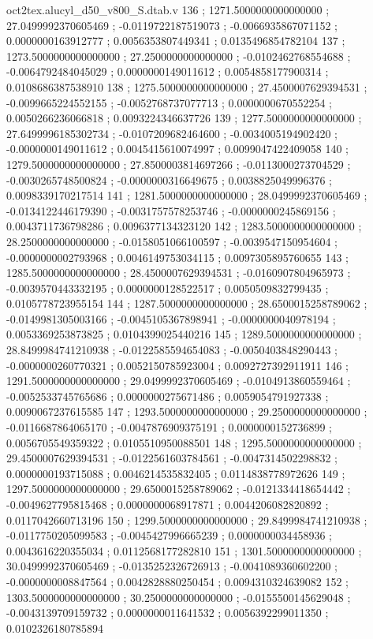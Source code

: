 \begin{filecontents}[overwrite]{oct2tex.alucyl_d50_v800_S.dtab.v}
136 ; 1271.5000000000000000 ; 27.0499992370605469 ; -0.0119722187519073 ; -0.0066935867071152 ; 0.0000000163912777 ; 0.0056353807449341 ; 0.0135496854782104
137 ; 1273.5000000000000000 ; 27.2500000000000000 ; -0.0102462768554688 ; -0.0064792484045029 ; 0.0000000149011612 ; 0.0054858177900314 ; 0.0108686387538910
138 ; 1275.5000000000000000 ; 27.4500007629394531 ; -0.0099665224552155 ; -0.0052768737077713 ; 0.0000000670552254 ; 0.0050266236066818 ; 0.0093224346637726
139 ; 1277.5000000000000000 ; 27.6499996185302734 ; -0.0107209682464600 ; -0.0034005194902420 ; -0.0000000149011612 ; 0.0045415610074997 ; 0.0099047422409058
140 ; 1279.5000000000000000 ; 27.8500003814697266 ; -0.0113000273704529 ; -0.0030265748500824 ; -0.0000000316649675 ; 0.0038825049996376 ; 0.0098339170217514
141 ; 1281.5000000000000000 ; 28.0499992370605469 ; -0.0134122446179390 ; -0.0031757578253746 ; -0.0000000245869156 ; 0.0043711736798286 ; 0.0096377134323120
142 ; 1283.5000000000000000 ; 28.2500000000000000 ; -0.0158051066100597 ; -0.0039547150954604 ; -0.0000000002793968 ; 0.0046149753034115 ; 0.0097305895760655
143 ; 1285.5000000000000000 ; 28.4500007629394531 ; -0.0160907804965973 ; -0.0039570443332195 ; 0.0000000128522517 ; 0.0050509832799435 ; 0.0105778723955154
144 ; 1287.5000000000000000 ; 28.6500015258789062 ; -0.0149981305003166 ; -0.0045105367898941 ; -0.0000000040978194 ; 0.0053369253873825 ; 0.0104399025440216
145 ; 1289.5000000000000000 ; 28.8499984741210938 ; -0.0122585594654083 ; -0.0050403848290443 ; -0.0000000260770321 ; 0.0052150785923004 ; 0.0092727392911911
146 ; 1291.5000000000000000 ; 29.0499992370605469 ; -0.0104913860559464 ; -0.0052533745765686 ; 0.0000000275671486 ; 0.0059054791927338 ; 0.0090067237615585
147 ; 1293.5000000000000000 ; 29.2500000000000000 ; -0.0116687864065170 ; -0.0047876909375191 ; 0.0000000152736899 ; 0.0056705549359322 ; 0.0105510950088501
148 ; 1295.5000000000000000 ; 29.4500007629394531 ; -0.0122561603784561 ; -0.0047314502298832 ; 0.0000000193715088 ; 0.0046214535832405 ; 0.0114838778972626
149 ; 1297.5000000000000000 ; 29.6500015258789062 ; -0.0121334418654442 ; -0.0049627795815468 ; 0.0000000068917871 ; 0.0044206082820892 ; 0.0117042660713196
150 ; 1299.5000000000000000 ; 29.8499984741210938 ; -0.0117750205099583 ; -0.0045427996665239 ; 0.0000000034458936 ; 0.0043616220355034 ; 0.0112568177282810
151 ; 1301.5000000000000000 ; 30.0499992370605469 ; -0.0135252326726913 ; -0.0041089360602200 ; -0.0000000008847564 ; 0.0042828880250454 ; 0.0094310324639082
152 ; 1303.5000000000000000 ; 30.2500000000000000 ; -0.0155500145629048 ; -0.0043139709159732 ; 0.0000000011641532 ; 0.0056392299011350 ; 0.0102326180785894

\end{filecontents}
